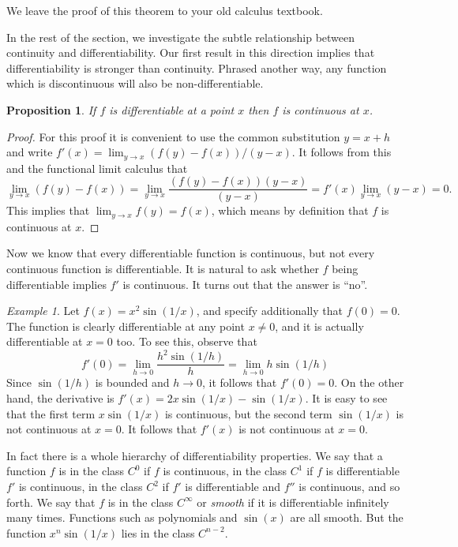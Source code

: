 \documentclass[11pt,oneside]{amsbook}
\theoremstyle{definition}
\theoremstyle{plain}
\newtheorem{proposition}[theorem]{Proposition}
\theoremstyle{definition}
\theoremstyle{remark}
\newtheorem{example}[theorem]{Example}
\numberwithin{equation}{section}
\numberwithin{figure}{section}
\begin{document}
We leave the proof of this theorem to your old calculus textbook.

In the rest of the section, we investigate the subtle relationship between continuity and differentiability. Our first result in this direction implies that differentiability is stronger than continuity. Phrased another way, any function which is discontinuous will also be non-differentiable.

\begin{proposition}
  If $f$ is differentiable at a point $x$ then $f$ is continuous at $x$.
\end{proposition}

\begin{proof}
  For this proof it is convenient to use the common substitution $y=x+h$ and write $f'(x)=\lim_{y\to x}(f(y)-f(x))/(y-x)$. It follows from this and the functional limit calculus that
\[\lim_{y\to x}(f(y)-f(x))=\lim_{y\to x}\frac{(f(y)-f(x))(y-x)}{(y-x)}
=f'(x)\lim_{y\to x}(y-x)=0\text{.}
\]
This implies that $\lim_{y\to x}f(y)=f(x)$, which means by definition that $f$ is continuous at $x$.
\end{proof}

Now we know that every differentiable function is continuous, but not every continuous function is differentiable. It is natural to ask whether $f$ being differentiable implies $f'$ is continuous. It turns out that the answer is ``no''.

\begin{example}
  Let $f(x)=x^2\sin(1/x)$, and specify additionally that $f(0)=0$. The function is clearly differentiable at any point $x\neq0$, and it is actually differentiable at $x=0$ too. To see this, observe that
\[f'(0)=\lim_{h\to0}\frac{h^2\sin(1/h)}{h}=\lim_{h\to0}h\sin(1/h)
\]
Since $\sin(1/h)$ is bounded and $h\to 0$, it follows that $f'(0)=0$. On the other hand, the derivative is $f'(x)=2x\sin(1/x)-\sin(1/x)$. It is easy to see that the first term $x\sin(1/x)$ is continuous, but the second term $\sin(1/x)$ is not continuous at $x=0$. It follows that $f'(x)$ is not continuous at $x=0$.
\end{example}

In fact there is a whole hierarchy of differentiability properties. We say that a function $f$ is in the class $C^0$ if $f$ is continuous, in the class $C^1$ if $f$ is differentiable $f'$ is continuous, in the class $C^2$ if $f'$ is differentiable and $f''$ is continuous, and so forth. We say that $f$ is in the class $C^\infty$ or \emph{smooth} if it is differentiable infinitely many times. Functions such as polynomials and $\sin(x)$ are all smooth. But the function $x^n\sin(1/x)$ lies in the class $C^{n-2}$.
\end{document}
